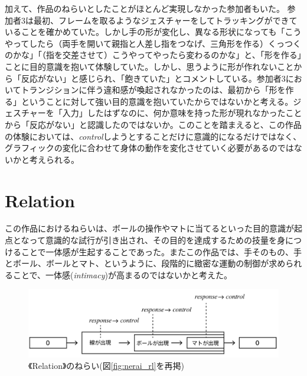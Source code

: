 加えて、作品のねらいとしたことがほとんど実現しなかった参加者もいた。
参加者3は最初、フレームを取るようなジェスチャーをしてトラッキングができていることを確かめていた。しかし手の形が変化し、異なる形状になっても「こうやってしたら（両手を開いて親指と人差し指をつなげ、三角形を作る）くっつくのかな」「（指を交差させて）こうやってやったら変わるのかな」と、「形を作る」ことに目的意識を抱いて体験していた。しかし、思うように形が作れないことから「反応がない」と感じられ、「飽きていた」とコメントしている。参加者3においてトランジションに伴う違和感が喚起されなかったのは、最初から「形を作る」ということに対して強い目的意識を抱いていたからではないかと考える。ジェスチャーを「入力」したはずなのに、何か意味を持った形が現れなかったことから「反応がない」と認識したのではないか。このことを踏まえると、この作品の体験においては、\textit{control}しようとすることだけに意識的になるだけではなく、グラフィックの変化に合わせて身体の動作を変化させていく必要があるのではないかと考えられる。

\section{Relation}
この作品におけるねらいは、ボールの操作やマトに当てるといった目的意識が起点となって意識的な試行が引き出され、その目的を達成するための技量を身につけることで一体感が生起することであった。またこの作品では、手そのもの、手とボール、ボールとマト、というように、段階的に緻密な運動の制御が求められることで、一体感(\textit{intimacy})が高まるのではないかと考えた。

\begin{figure}[H]
  \centering
  \includegraphics[width=15cm]{img/nerai_rl.png}
  \caption{《Relation》のねらい(図\ref{fig:nerai_rl}を再掲)}
  \label{fig:nerai_rl_in_discussion}
\end{figure}

